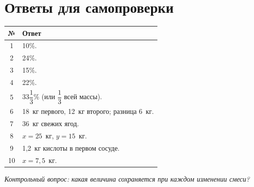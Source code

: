 \documentclass[a4paper,12pt]{article}
\begin{document}
\clearpage
\section*{Ответы для самопроверки}
\renewcommand{\arraystretch}{1.65}
\begin{tabularx}{\linewidth}{@{}cX@{}}
\toprule
\textbf{№} & \textbf{Ответ}\\
\midrule
1 & 10\%.\\
2 & 24\%.\\
3 & 15\%.\\
4 & 22\%.\\
5 & \(33\dfrac13\%\) (или \(\dfrac13\) всей массы).\\
6 & 18~кг первого, 12~кг второго; разница 6~кг.\\
7 & 36~кг свежих ягод.\\
8 & \(x=25\)~кг, \(y=15\)~кг.\\
9 & 1{,}2~кг кислоты в первом сосуде.\\
10 & \(x=7{,}5\)~кг.\\
\bottomrule
\end{tabularx}
\vspace{8mm}
\textit{Контрольный вопрос: какая величина сохраняется при каждом изменении смеси?}
\end{document}
